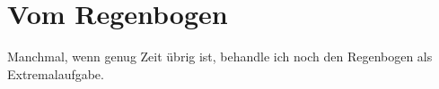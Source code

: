 \documentclass[%
11pt,%
twoside,%
titlepage,%
german,%
headsepline%
]{scrartcl}
\begin{document}
\clearpage

\section{Vom Regenbogen}
Manchmal,
wenn genug Zeit übrig ist, behandle ich noch den Regenbogen als Extremalaufgabe.

\cleardoublepage
\listoffigures
\listoftables
%
%
\end{document}
